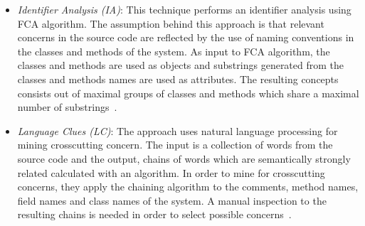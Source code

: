 \begin{itemize}
In the context of discovering possible concerns DA applies FCA\footnote{FCA is a mathematical theory of data analysis which describe relationship between a particular set of objects and a particular set of attributes~\cite{PrissFCA}} to get execution traces.
In other words, the obtained execution traces are analyzed using FCA for identifying methods and classes.  
Thus, methods belonging to more than one class may indicate presence of scattering code. 
If different methods from same class are specific to more than one use-case may indicate presence of tangling code~\cite{Ceccato:2008:ASM:1545010.1545380}.

\item \textit{Identifier Analysis (IA)}: This technique performs an identifier analysis using FCA algorithm. The assumption behind this approach is that relevant concerns in the source code are reflected by the use of naming conventions in the classes and methods of the system. As input to FCA algorithm, the classes and methods are used as objects and substrings generated from the classes and methods names are used as attributes. The resulting concepts consists out of maximal groups of classes and methods which share a maximal number of substrings~\cite{Tourwe:2004:MAV:1018444.1022149}.

\item \textit{Language Clues (LC)}: The approach uses natural language processing for mining crosscutting concern. The input is a collection of words from the source code and the output, chains of words which are semantically strongly related calculated with an algorithm. In order to mine for crosscutting concerns, they apply the chaining algorithm to the comments, method names, field names and class names of the system. A manual inspection to the resulting chains is needed in order to select possible concerns~\cite{Shepherd:2005:ULC:1083125.1083129}.


\end{itemize}
